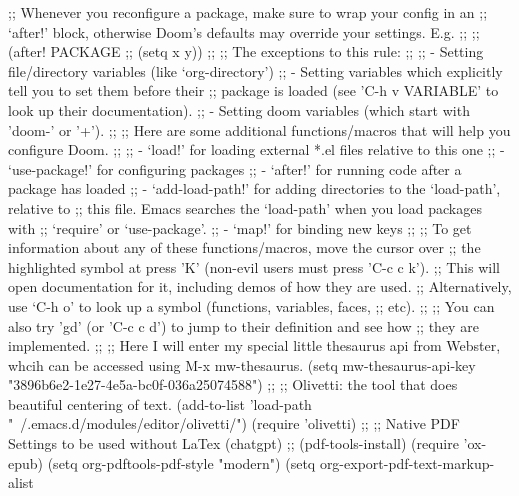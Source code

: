 ;; Whenever you reconfigure a package, make sure to wrap your config in an
;; `after!' block, otherwise Doom's defaults may override your settings. E.g.
;;
;;   (after! PACKAGE
;;     (setq x y))
;;
;; The exceptions to this rule:
;;
;;   - Setting file/directory variables (like `org-directory')
;;   - Setting variables which explicitly tell you to set them before their
;;     package is loaded (see 'C-h v VARIABLE' to look up their documentation).
;;   - Setting doom variables (which start with 'doom-' or '+').
;;
;; Here are some additional functions/macros that will help you configure Doom.
;;
;; - `load!' for loading external *.el files relative to this one
;; - `use-package!' for configuring packages
;; - `after!' for running code after a package has loaded
;; - `add-load-path!' for adding directories to the `load-path', relative to
;;   this file. Emacs searches the `load-path' when you load packages with
;;   `require' or `use-package'.
;; - `map!' for binding new keys
;;
;; To get information about any of these functions/macros, move the cursor over
;; the highlighted symbol at press 'K' (non-evil users must press 'C-c c k').
;; This will open documentation for it, including demos of how they are used.
;; Alternatively, use `C-h o' to look up a symbol (functions, variables, faces,
;; etc).
;;
;; You can also try 'gd' (or 'C-c c d') to jump to their definition and see how
;; they are implemented.
;;
;; Here I will enter my special little thesaurus api from Webster, whcih can be accessed using M-x mw-thesaurus.
(setq mw-thesaurus-api-key "3896b6e2-1e27-4e5a-bc0f-036a25074588")
;;
;; Olivetti: the tool that does beautiful centering of text.
(add-to-list 'load-path "~/.emacs.d/modules/editor/olivetti/")
(require 'olivetti)
;;
;; Native PDF Settings to be used without LaTex (chatgpt)
;;
(pdf-tools-install)
(require 'ox-epub)
(setq org-pdftools-pdf-style "modern")
(setq org-export-pdf-text-markup-alist
